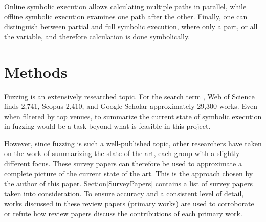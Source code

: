 \documentclass{article}
\begin{document}
\begin{multicols}{2}
  Online symbolic execution allows calculating multiple paths in parallel, while offline symbolic execution examines one path after the other. Finally, one can distinguish between partial and full symbolic execution, where only a part, or all the variable, and therefore calculation is done symbolically.\cite{Ghidrion}

  \section{Methods}
  \label{Methods}
  Fuzzing is an extensively researched topic. For the search term , Web of Science\cite{WebOfScience} finds 2,741, Scopus\cite{Scopus} 2,410, and Google Scholar\cite{GoogleScholar} approximately 29,300 works. Even when filtered by top venues, to summarize the current state of symbolic execution in fuzzing would be a task beyond what is feasible in this project.

  However, since fuzzing is such a well-published topic, other researchers have taken on the work of summarizing the state of the art, each group with a slightly different focus. These survey papers can therefore be used to approximate a complete picture of the current state of the art. This is the approach chosen by the author of this paper. Section\ref{SurveyPapers} contains a list of survey papers taken into consideration. To ensure accuracy and a consistent level of detail, works discussed in these review papers (primary works) are used to corroborate or refute how review papers discuss the contributions of each primary work.


\end{multicols}
\end{document}
